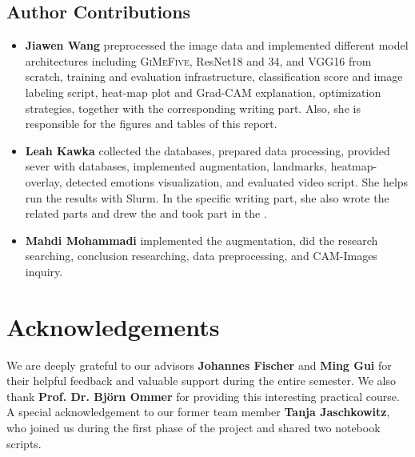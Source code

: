 \subsection*{Author Contributions}
\label{sec:author}

\begin{itemize}
  \item \textbf{Jiawen Wang} preprocessed the image data 
  and implemented different model architectures including \textsc{GiMeFive}, ResNet18 and 34, 
  and VGG16 from scratch, 
  training and evaluation infrastructure, classification score and image labeling script, 
  heat-map plot and Grad-CAM explanation, optimization strategies, 
  together with the corresponding writing part. 
  Also, she is responsible for the figures and tables of this report.
  \item \textbf{Leah Kawka} collected the databases, prepared data processing, provided sever with databases, 
  implemented augmentation, landmarks, heatmap-overlay, detected emotions visualization, 
  and evaluated video script. 
  She helps run the results with Slurm. 
  In the specific writing part, 
  she also wrote the related parts and drew the  and took part in the .
  \item \textbf{Mahdi Mohammadi} implemented the augmentation, did the research searching, conclusion researching, data preprocessing, and CAM-Images inquiry.
\end{itemize}

\section*{Acknowledgements}

We are deeply grateful to our advisors \textbf{Johannes Fischer} and \textbf{Ming Gui} for their helpful feedback and valuable support during the entire semester. 
We also thank \textbf{Prof. Dr. Björn Ommer} for providing this interesting practical course. 
A special acknowledgement to our former team member \textbf{Tanja Jaschkowitz}, 
who joined us during the first phase of the project and shared two notebook scripts.

